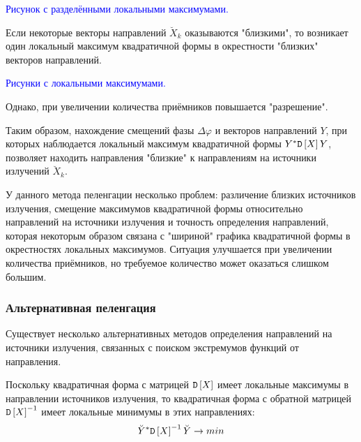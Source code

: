 \begin{Matlab}
\end{Matlab}
\textcolor{blue}{Рисунок с разделёнными локальными максимумами.}

Если некоторые векторы направлений $\breve{X}_k$ оказываются "близкими"{}, то возникает один локальный максимум квадратичной формы в окрестности "близких"{} векторов направлений.

\begin{Matlab}
\end{Matlab}
\textcolor{blue}{Рисунки с локальными максимумами.}

Однако,  при увеличении количества приёмников повышается "разрешение"{}.

Таким образом, нахождение смещений фазы $\Delta \varphi$ и векторов направлений $Y$, при которых наблюдается локальный максимум квадратичной формы
$Y^* \mathtt{D} \left [ X \right ] Y$, позволяет находить направления "близкие"{} к направлениям на источники излучений $\breve{X}_k$.

У данного метода пеленгации несколько проблем: различение близких источников излучения, смещение максимумов квадратичной формы относительно направлений на источники излучения
и точность определения направлений, которая некоторым образом связана с "шириной"{} графика квадратичной формы в окрестностях локальных максимумов. Ситуация улучшается при
увеличении количества приёмников, но требуемое количество может оказаться слишком большим.

\subsubsection{Альтернативная пеленгация}

Существует несколько альтернативных методов определения направлений на источники излучения, связанных с поиском экстремумов функций от направления.

Поскольку квадратичная форма с матрицей $\mathtt{D} \left [ X \right ]$ имеет локальные максимумы в направлении источников излучения, то квадратичная форма с обратной матрицей $\mathtt{D} \left [ X \right ]^{-1}$
имеет локальные минимумы в этих направлениях:
\[
    \breve{Y}^* \mathtt{D} \left [ X \right ]^{-1} \breve{Y} \rightarrow min
\]

